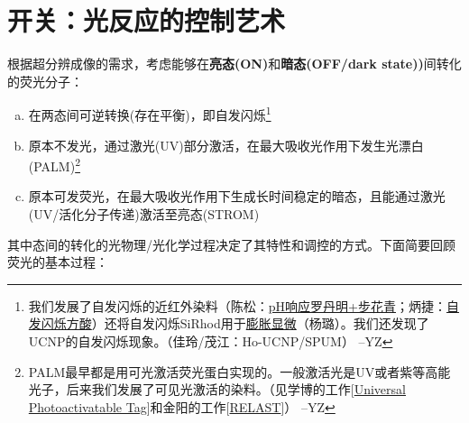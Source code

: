 \documentclass[12pt]{ctexart}
\begin{document}
\section*{开关：光反应的控制艺术}
根据超分辨成像的需求，考虑能够在\textbf{亮态(ON)}和\textbf{暗态(OFF/dark state))}间转化的荧光分子：
\begin{framed}
    \begin{enumerate}[a)]
        \item 在两态间可逆转换(存在平衡)，即自发闪烁\footnote{我们发展了自发闪烁的近红外染料（陈松：\href{https://pubs.acs.org/doi/abs/10.1021/acs.analchem.4c02445}{pH响应罗丹明+步花青}；炳捷：\href{https://pubs.acs.org/doi/10.1021/acs.nanolett.4c00595}{自发闪烁方酸}）还将自发闪烁SiRhod用于\href{https://pubs.acs.org/doi/10.1021/cbmi.5c00037}{膨胀显微}（杨璐）。我们还发现了UCNP的自发闪烁现象。（佳玲/茂江：Ho-UCNP/SPUM） --YZ}
        \item 原本不发光，通过激光(UV)部分激活，在最大吸收光作用下发生光漂白(PALM)\footnote{PALM最早都是用可光激活荧光蛋白实现的。一般激活光是UV或者紫等高能光子，后来我们发展了可见光激活的染料。（见学博的工作[\href{https://onlinelibrary.wiley.com/doi/abs/10.1002/ange.202211767}{Universal Photoactivatable Tag}]和金阳的工作[\href{https://pubs.acs.org/doi/10.1021/acsnano.5c03182}{RELAST}]） --YZ}
        \item 原本可发荧光，在最大吸收光作用下生成长时间稳定的暗态，且能通过激光(UV/活化分子传递)激活至亮态(STROM)
    \end{enumerate}
\end{framed}
\noindent 其中态间的转化的光物理/光化学过程决定了其特性和调控的方式。下面简要回顾荧光的基本过程：
\end{document}
